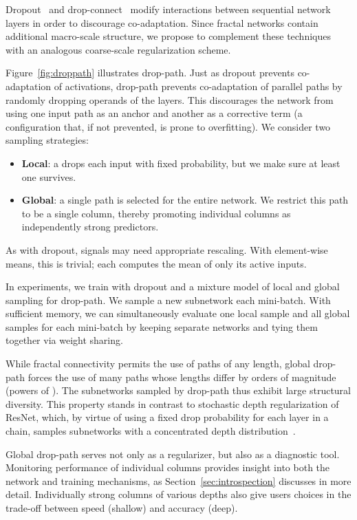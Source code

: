 \documentclass{article}
\newcommand{\resnet}{ResNet}
\newcommand{\dropout}{dropout}
\newcommand{\dropconn}{drop-connect}
\newcommand{\droppath}{drop-path}
\newcommand{\Dropout}{Dropout}
\begin{document}
{\Dropout}~\citep{dropout} and {\dropconn}~\citep{dropconnect} modify
interactions between sequential network layers in order to discourage
co-adaptation.  Since fractal networks contain additional macro-scale
structure, we propose to complement these techniques with an analogous
coarse-scale regularization scheme.

Figure~\ref{fig:droppath} illustrates {\droppath}.  Just as {\dropout} prevents
co-adaptation of activations, {\droppath} prevents co-adaptation of parallel
paths by randomly dropping operands of the  layers.  This
discourages the network from using one input path as an anchor and another as a
corrective term (a configuration that, if not prevented, is prone to
overfitting).  We consider two sampling strategies:
\begin{itemize}
   \item{
      \textbf{Local}: a  drops each input with fixed
      probability, but we make sure at least one survives.
   }
   \item{
      \textbf{Global}: a single path is selected for the entire network.
      We restrict this path to be a single column, thereby promoting
      individual columns as independently strong predictors.
   }
\end{itemize}
As with {\dropout}, signals may need appropriate rescaling.  With element-wise
means, this is trivial; each  computes the mean of only its
active inputs.

In experiments, we train with {\dropout} and a mixture model of  local
and  global sampling for {\droppath}.  We sample a new subnetwork each
mini-batch.  With sufficient memory, we can simultaneously evaluate one local
sample and all global samples for each mini-batch by keeping separate
networks and tying them together via weight sharing.

While fractal connectivity permits the use of paths of any length, global
{\droppath} forces the use of many paths whose lengths differ by orders of
magnitude (powers of ).  The subnetworks sampled by {\droppath} thus exhibit
large structural diversity.  This property stands in contrast to stochastic
depth regularization of {\resnet}, which, by virtue of using a fixed drop
probability for each layer in a chain, samples subnetworks with a concentrated
depth distribution~\citep{huang2016stochasticdepth}.

Global {\droppath} serves not only as a regularizer, but also as a diagnostic
tool.  Monitoring performance of individual columns provides insight into both
the network and training mechanisms, as Section~\ref{sec:introspection}
discusses in more detail.  Individually strong columns of various depths also
give users choices in the trade-off between speed (shallow) and accuracy
(deep).
\end{document}
